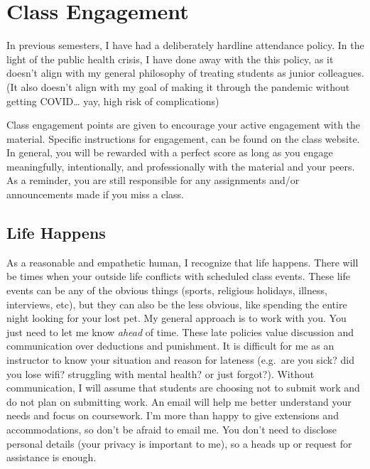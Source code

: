 \hypertarget{class-engagement}{%
\chapter{Class Engagement}\label{class-engagement}}

In previous semesters, I have had a deliberately hardline attendance policy.
In the light of the public health crisis, I have done away with the this policy, as it doesn't align with my general philosophy of treating students as junior colleagues. (It also doesn't align with my goal of making it through the pandemic without getting COVID\ldots{} yay, high risk of complications)

Class engagement points are given to encourage your active engagement with the material.
Specific instructions for engagement, can be found on the class website. In general, you will be rewarded with a perfect score as long as you engage meaningfully, intentionally, and professionally with the material and your peers. As a reminder, you are still responsible for any assignments and/or announcements made if you miss a class.

\hypertarget{life-happens}{%
\section{Life Happens}\label{life-happens}}

As a reasonable and empathetic human, I recognize that life happens.
There will be times when your outside life conflicts with scheduled class events.
These life events can be any of the obvious things (sports, religious holidays, illness, interviews, etc), but they can also be the less obvious, like spending the entire night looking for your lost pet.
My general approach is to work with you. You just need to let me know \emph{ahead} of time.
These late policies value discussion and communication over deductions and punishment.
It is difficult for me as an instructor to know your situation and reason for lateness (e.g.~are you sick? did you lose wifi? struggling with mental health? or just forgot?).
Without communication, I will assume that students are choosing not to submit work and do not plan on submitting work.
An email will help me better understand your needs and focus on coursework.
I'm more than happy to give extensions and accommodations, so don't be afraid to email me.
You don't need to disclose personal details (your privacy is important to me), so a heads up or request for assistance is enough.


